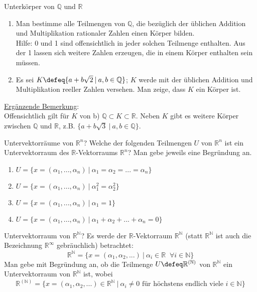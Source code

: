 \documentclass{uebblatt}
\begin{document}
\begin{aufgabe}{Unterkörper von $\mathbb{Q}$ und $\mathbb{R}$}
\begin{enumerate}
\item Man bestimme alle Teilmengen von $\mathbb{Q}$, die bezüglich der üblichen Addition und Multiplikation rationaler Zahlen einen Körper bilden.\\
Hilfe: 0 und 1 sind offensichtlich in jeder solchen Teilmenge enthalten. Aus der 1 lassen sich weitere Zahlen erzeugen, die in einem Körper enthalten sein müssen.
\item Es sei $K \defeq \{a + b\sqrt{2} \> | \> a, b \in \mathbb{Q}\}$; $K$ werde mit der üblichen Addition und Multiplikation reeller Zahlen versehen. Man zeige, dass $K$ ein Körper ist.
\end{enumerate}
\underline{Ergänzende Bemerkung}:\\
Offensichtlich gilt für $K$ von b) $\mathbb{Q} \subset K \subset \mathbb{R}$. Neben $K$ gibt es weitere Körper zwischen $\mathbb{Q}$ und $\mathbb{R}$, z.B. $\{a + b\sqrt{3} \> | \> a, b \in \mathbb{Q}\}$.
\end{aufgabe}


\begin{aufgabe}{Untervektorräume von $\mathbb{R}^n$?}
Welche der folgenden Teilmengen $U$ von $\mathbb{R}^n$ ist ein Untervektorraum des $\mathbb{R}$-Vektorraums $\mathbb{R}^n$? Man gebe jeweils eine Begründung an.
\begin{enumerate}
\item $U = \{x = (\alpha_1, ..., \alpha_n) \> | \> \alpha_1 = \alpha_2 = ... = \alpha_n\}$
\item $U = \{x = (\alpha_1, ..., \alpha_n) \> | \> \alpha_1^2 = \alpha_2^2\}$
\item $U = \{x = (\alpha_1, ..., \alpha_n) \> | \> \alpha_1 = 1\}$
\item $U = \{x = (\alpha_1, ..., \alpha_n) \> | \>  \alpha_1 + \alpha_2 + ... + \alpha_n = 0\}$
\end{enumerate}
\end{aufgabe}


\begin{aufgabe}{Untervektorraum von $\mathbb{R}^\mathbb{N}$?}
Es werde der $\mathbb{R}$-Vektorraum $\mathbb{R}^\mathbb{N}$ (statt $\mathbb{R}^\mathbb{N}$ ist auch die Bezeichnung $\mathbb{R}^\infty$ gebräuchlich) betrachtet:
$$\mathbb{R}^\mathbb{N} = \{x = (\alpha_1, \alpha_2, ...) \> | \> \alpha_i \in \mathbb{R} \; \; \forall i \in \mathbb{N}\}$$
Man gebe mit Begründung an, ob die Teilmenge $U \defeq \mathbb{R}^{(\mathbb{N})}$ von $\mathbb{R}^\mathbb{N}$ ein Untervektorraum von $\mathbb{R}^\mathbb{N}$ ist, wobei $$\mathbb{R}^{(\mathbb{N})} = \{x = (\alpha_1, \alpha_2, ...) \in \mathbb{R}^\mathbb{N} \> | \> \alpha_i \neq 0 \text{ für höchstens endlich viele } i \in \mathbb{N}\}$$
\end{aufgabe}
\end{document}
